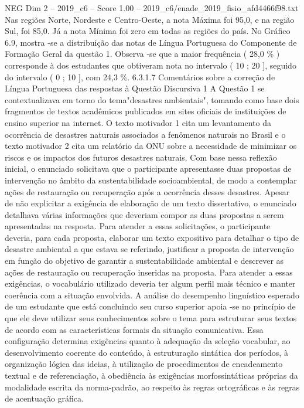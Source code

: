 \begin{textsample}{NEG Dim 2 – 2019\_c6 – Score 1.00 – 2019\_c6/enade\_2019\_fisio\_afd4466f98.txt}
Nas regiões Norte, Nordeste e Centro-Oeste, a nota Máxima foi 95,0, e na região Sul, foi 85,0.
Já a nota Mínima foi zero em todas as regiões do país.
No Gráfico 6.9, mostra -se a distribuição das notas de Língua Portuguesa do Componente de Formação Geral da questão 1.
Observa -se que a maior frequência ( 28,0 \% ) corresponde à dos estudantes que obtiveram nota no intervalo ( 10 ; 20 ], seguido do intervalo ( 0 ; 10 ], com 24,3 \%. 6.3.1.7 Comentários sobre a correção de Língua Portuguesa das respostas à Questão Discursiva 1 A Questão 1 se contextualizava em torno do tema"desastres ambientais", tomando como base dois fragmentos de textos acadêmicos publicados em sites oficiais de instituições de ensino superior na internet.
O texto motivador 1 cita um levantamento da ocorrência de desastres naturais associados a fenômenos naturais no Brasil e o texto motivador 2 cita um relatório da ONU sobre a necessidade de minimizar os riscos e os impactos dos futuros desastres naturais.
Com base nessa reflexão inicial, o enunciado solicitava que o participante apresentasse duas propostas de intervenção no âmbito da sustentabilidade socioambiental, de modo a contemplar ações de restauração ou recuperação após a ocorrência desses desastres.
Apesar de não explicitar a exigência de elaboração de um texto dissertativo, o enunciado detalhava várias informações que deveriam compor as duas propostas a serem apresentadas na resposta.
Para atender a essas solicitações, o participante deveria, para cada proposta, elaborar um texto expositivo para detalhar o tipo de desastre ambiental a que estava se referindo, justificar a proposta de intervenção em função do objetivo de garantir a sustentabilidade ambiental e descrever as ações de restauração ou recuperação inseridas na proposta.
Para atender a essas exigências, o vocabulário utilizado deveria ter algum perfil mais técnico e manter coerência com a situação envolvida.
A análise do desempenho linguístico esperado de um estudante que está concluindo seu curso superior apoia -se no princípio de que ele deve utilizar seus conhecimentos sobre o tema para estruturar seus textos de acordo com as características formais da situação comunicativa.
Essa configuração determina exigências quanto à adequação da seleção vocabular, ao desenvolvimento coerente do conteúdo, à estruturação sintática dos períodos, à organização lógica das ideias, à utilização de procedimentos de encadeamento textual e de referenciação, à obediência às exigências morfossintáticas próprias da modalidade escrita da norma-padrão, ao respeito às regras ortográficas e às regras de acentuação gráfica.

\end{textsample}
